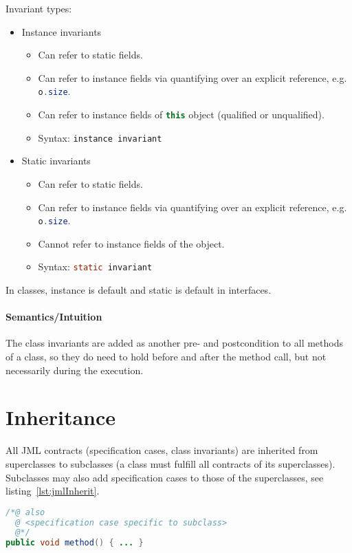 \documentclass[a4paper, 11pt, accentcolor = tud3b]{tudreport}
\newcommand{\inlineJava}[1]{\lstinline[language = Java]|#1|}
\begin{document}
				Invariant types:
				\begin{itemize}
					\item Instance invariants
						\begin{itemize}
							\item Can refer to static fields.
							\item Can refer to instance fields via quantifying over an explicit reference, e.g. \inlineJava{o.size}.
							\item Can refer to instance fields of \inlineJava{this} object (qualified or unqualified).
							\item Syntax: \inlineJava{instance invariant}
						\end{itemize}
					\item Static invariants
						\begin{itemize}
							\item Can refer to static fields.
							\item Can refer to instance fields via quantifying over an explicit reference, e.g. \inlineJava{o.size}.
							\item Cannot refer to instance fields of the object.
							\item Syntax: \inlineJava{static invariant}
						\end{itemize}
				\end{itemize}
				In classes, instance is default and static is default in interfaces.
				
				\paragraph{Semantics/Intuition}
					The class invariants are added as another pre- and postcondition to all methods of a class, so they do need to hold before and after the method call, but not necessarily during the execution.

		\section{Inheritance}
			All JML contracts (specification cases, class invariants) are inherited from superclasses to subclasses (a class must fulfill all contracts of its superclasses). Subclasses may also add specification cases to those of the superclasses, see listing~\ref{lst:jmlInherit}.
			
			\begin{lstlisting}[caption = { Inheritance in JML }, label = lst:jmlInherit, language = Java]
/*@ also
  @ <specification case specific to subclass>
  @*/
public void method() { ... }
			\end{lstlisting}
\end{document}
